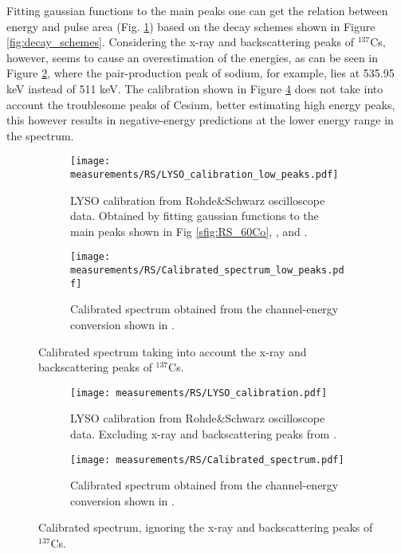 Fitting gaussian functions to the main peaks one can get the relation between energy and pulse area (Fig. \ref{sfig:RS_LYSO_calibration_low_peaks}) based on the decay schemes shown in Figure \ref{fig:decay_schemes}. Considering the x-ray and backscattering peaks of $^{137}$Cs, however, seems to cause an overestimation of the energies, as can be seen in Figure \ref{sfig:RS_LYSO_calibrated_spectrum_low_peaks}, where the pair-production peak of sodium, for example, lies at 535.95 keV instead of 511 keV. The calibration shown in Figure \ref{sfig:RS_LYSO_calibration} does not take into account the troublesome peaks of Cesium, better estimating high energy peaks, this however results in negative-energy predictions at the lower energy range in the spectrum.

\begin{figure}[H]
  \begin{subfigure}[t]{\textwidth}
    \centering
    \texttt{[image: measurements/RS/LYSO\_calibration\_low\_peaks.pdf]}
    \caption{\label{sfig:RS_LYSO_calibration_low_peaks}LYSO calibration from Rohde\&Schwarz oscilloscope data. Obtained by fitting gaussian functions to the main peaks shown in Fig \ref{sfig:RS_60Co}, , and .}
  \end{subfigure}
  \medskip
  \begin{subfigure}[t]{\textwidth}
    \centering
    \texttt{[image: measurements/RS/Calibrated\_spectrum\_low\_peaks.pdf]}
    \caption{\label{sfig:RS_LYSO_calibrated_spectrum_low_peaks}Calibrated spectrum obtained from the channel-energy conversion shown in .}
  \end{subfigure}
  \caption{\label{fig:RS_low_peaks_calibration}Calibrated spectrum taking into account the x-ray and backscattering peaks of $^{137}$Cs.}
\end{figure}

\begin{figure}[H]
  \begin{subfigure}[t]{\textwidth}
    \centering
    \texttt{[image: measurements/RS/LYSO\_calibration.pdf]}
    \caption{\label{sfig:RS_LYSO_calibration}LYSO calibration from Rohde\&Schwarz oscilloscope data. Excluding x-ray and backscattering peaks from .}
  \end{subfigure}
  \medskip
  \begin{subfigure}[t]{\textwidth}
    \centering
    \texttt{[image: measurements/RS/Calibrated\_spectrum.pdf]}
    \caption{\label{sfig:RS_LYSO_calibrated_spectrum}Calibrated spectrum obtained from the channel-energy conversion shown in .}
  \end{subfigure}
  \caption{\label{fig:RS_calibration}Calibrated spectrum, ignoring the x-ray and backscattering peaks of $^{137}$Cs.}
\end{figure}

